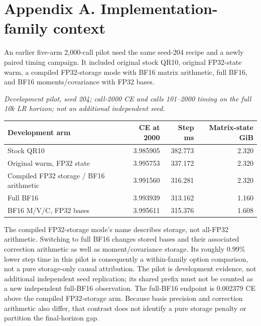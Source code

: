 \hypertarget{appendix-a.-implementation-family-context}{%
\section{Appendix A. Implementation-family
context}\label{appendix-a.-implementation-family-context}}

An earlier five-arm 2,000-call pilot used the same seed-204 recipe and a
newly paired timing campaign. It included original stock QR10, original
FP32-state warm, a compiled FP32-storage mode with BF16 matrix
arithmetic, full BF16, and BF16 moments/covariance with FP32 bases.

\begin{minipage}{\linewidth}

\emph{Development pilot, seed 204; call-2000 CE and calls 101--2000
timing on the full 10k LR horizon; not an additional independent seed.}

\begin{center}
\begin{tabular}{@{}lrrr@{}}
\toprule\noalign{}
Development arm & CE at 2000 & Step ms & Matrix-state GiB \\
\midrule\noalign{}
Stock QR10 & 3.985905 & 382.773 & 2.320 \\
Original warm, FP32 state & 3.995753 & 337.172 & 2.320 \\
Compiled FP32 storage / BF16 arithmetic & 3.991560 & 316.281 & 2.320 \\
Full BF16 & 3.993939 & 313.162 & 1.160 \\
BF16 M/V/C, FP32 bases & 3.995611 & 315.376 & 1.608 \\
\bottomrule
\end{tabular}
\end{center}

\end{minipage}

The compiled FP32-storage mode's name describes storage, not all-FP32
arithmetic. Switching to full BF16 changes stored bases and their
associated correction arithmetic as well as moment/covariance storage.
Its roughly 0.99\% lower step time in this pilot is consequently a
within-family option comparison, not a pure storage-only causal
attribution. The pilot is development evidence, not additional
independent seed replication; its shared prefix must not be counted as a
new independent full-BF16 observation. The full-BF16 endpoint is
0.002379 CE above the compiled FP32-storage arm. Because basis precision
and correction arithmetic also differ, that contrast does not identify a
pure storage penalty or partition the final-horizon gap.
